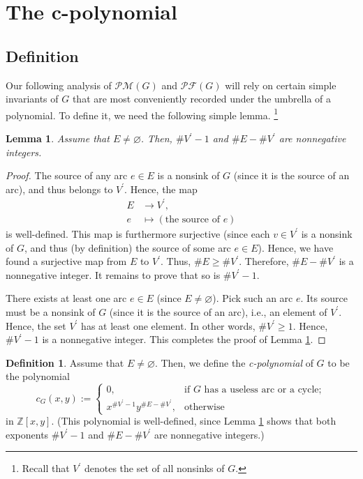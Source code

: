 \documentclass[12pt]{amsart}
\newtheorem{lemma}[theorem]{Lemma}
\theoremstyle{definition}
\newtheorem{definition}[theorem]{Definition}
\newcommand{\Pm}[1]{\mathcal{PM}\left(#1\right)}
\newcommand{\Pf}[1]{\mathcal{PF}\left(#1\right)}
\newcommand{\NS}{V^{\prime}}
\begin{document}
\section{\label{sect.cpol}The c-polynomial}

\subsection{Definition}

Our following analysis of $\Pm{G}$ and $\Pf{G}$ will rely on certain
simple invariants of $G$ that are most
conveniently recorded under the umbrella of a polynomial. To define it, we
need the following simple lemma.%
\footnote{Recall that $\NS$ denotes the set of all nonsinks of $G$.}

\begin{lemma}
\label{lem.cpol.wd}
Assume that $E\neq\varnothing$.
Then, $\#\NS -1$ and $\#E-\#\NS$ are nonnegative integers.
\end{lemma}


\begin{proof}
The source of any arc $e\in E$ is a nonsink of $G$ (since it is the source of
an arc), and thus belongs to $\NS$. Hence, the map%
\begin{align*}
E  &  \rightarrow \NS,\\
e  &  \mapsto\left(  \text{the source of }e\right)
\end{align*}
is well-defined. This map is furthermore surjective (since each $v\in
\NS$ is a nonsink of $G$, and thus (by definition) the source of some
arc $e\in E$). Hence, we have found a surjective map from $E$ to $\NS$.
Thus, $\#E\geq\#\NS$. Therefore, $\#E-\#\NS$ is a nonnegative
integer. It remains to prove that so is $\#\NS -1$.

There exists at least one arc $e\in E$ (since $E\neq\varnothing$). Pick such
an arc $e$. Its source must be a nonsink of $G$ (since it is the source of an
arc), i.e., an element of $\NS$. Hence, the set $\NS$ has at
least one element. In other words, $\#\NS\geq1$. Hence, $\#\NS -1$
is a nonnegative integer. This completes the proof of Lemma \ref{lem.cpol.wd}.
\end{proof}

\begin{definition}
\label{def.cpol.cpol}Assume that $E\neq\varnothing$.
Then, we define the \emph{c-polynomial} of $G$ to be the polynomial
\[
c_{G}\left(  x,y\right)  :=%
\begin{cases}
0, & \text{if }G\text{ has a useless arc or a cycle};\\
x^{\#\NS -1}y^{\#E-\#\NS}, & \text{otherwise}%
\end{cases}
\]
in $\mathbb{Z}\left[  x,y\right]  $. (This polynomial is well-defined, since
Lemma \ref{lem.cpol.wd} shows that both exponents $\#\NS -1$ and
$\#E-\#\NS$ are nonnegative integers.)
\end{definition}
\end{document}
